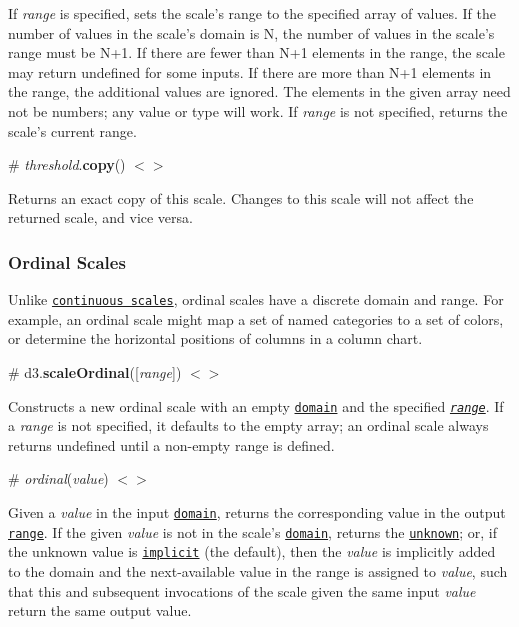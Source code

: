 If {\itshape range} is specified, sets the scale’s range to the specified array of values. If the number of values in the scale’s domain is N, the number of values in the scale’s range must be N+1. If there are fewer than N+1 elements in the range, the scale may return undefined for some inputs. If there are more than N+1 elements in the range, the additional values are ignored. The elements in the given array need not be numbers; any value or type will work. If {\itshape range} is not specified, returns the scale’s current range.

\label{_threshold_copy}%
\# {\itshape threshold}.{\bfseries copy}() \href{https://github.com/d3/d3-scale/blob/master/src/threshold.js#L26}{\tt $<$$>$}

Returns an exact copy of this scale. Changes to this scale will not affect the returned scale, and vice versa.

\subsubsection*{Ordinal Scales}

Unlike \href{#continuous-scales}{\tt continuous scales}, ordinal scales have a discrete domain and range. For example, an ordinal scale might map a set of named categories to a set of colors, or determine the horizontal positions of columns in a column chart.

\label{_scaleOrdinal}%
\# d3.{\bfseries scale\+Ordinal}(\mbox{[}{\itshape range}\mbox{]}) \href{https://github.com/d3/d3-scale/blob/master/src/ordinal.js}{\tt $<$$>$}

Constructs a new ordinal scale with an empty \href{#ordinal_domain}{\tt domain} and the specified \href{#ordinal_range}{\tt {\itshape range}}. If a {\itshape range} is not specified, it defaults to the empty array; an ordinal scale always returns undefined until a non-\/empty range is defined.

\label{__ordinal}%
\# {\itshape ordinal}({\itshape value}) \href{https://github.com/d3/d3-scale/blob/master/src/ordinal.js#L6}{\tt $<$$>$}

Given a {\itshape value} in the input \href{#ordinal_domain}{\tt domain}, returns the corresponding value in the output \href{#ordinal_range}{\tt range}. If the given {\itshape value} is not in the scale’s \href{#ordinal_domain}{\tt domain}, returns the \href{#ordinal_value}{\tt unknown}; or, if the unknown value is \href{#scaleImplicit}{\tt implicit} (the default), then the {\itshape value} is implicitly added to the domain and the next-\/available value in the range is assigned to {\itshape value}, such that this and subsequent invocations of the scale given the same input {\itshape value} return the same output value.

